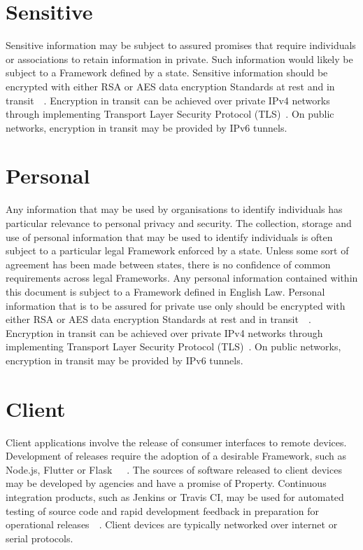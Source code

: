 \documentclass[11pt, oneside]{book}   	%
\begin{document}
\section{Sensitive}
Sensitive information may be subject to assured promises that require individuals or associations to retain information in private.
Such information would likely be subject to a Framework defined by a state.
Sensitive information should be encrypted with either RSA or AES data encryption Standards at rest and in transit~\cite{rsa}~\cite{aes}.
Encryption in transit can be achieved over private IPv4 networks through implementing Transport Layer Security Protocol (TLS)~\cite{tlsp}.
On public networks, encryption in transit may be provided by IPv6 tunnels.

\section{Personal}
Any information that may be used by organisations to identify individuals has particular relevance to personal privacy and security.
The collection, storage and use of personal information that may be used to identify individuals is often subject to a particular legal Framework enforced by a state.
Unless some sort of agreement has been made between states, there is no confidence of common requirements across legal Frameworks.
Any personal information contained within this document is subject to a Framework defined in English Law.
Personal information that is to be assured for private use only should be encrypted with either RSA or AES data encryption Standards at rest and in transit~\cite{rsa}~\cite{aes}.
Encryption in transit can be achieved over private IPv4 networks through implementing Transport Layer Security Protocol (TLS)~\cite{tlsp}.
On public networks, encryption in transit may be provided by IPv6 tunnels.

\section{Client}
Client applications involve the release of consumer interfaces to remote devices.
Development of releases require the adoption of a desirable Framework, such as Node.js, Flutter or Flask~\cite{node}~\cite{flutter}~\cite{flask}.
The sources of software released to client devices may be developed by agencies and have a promise of Property.
Continuous integration products, such as Jenkins or Travis CI, may be used for automated testing of source code and rapid development feedback in preparation for operational releases~\cite{jenkins}~\cite{travis}.
Client devices are typically networked over internet or serial protocols.\
\end{document}
